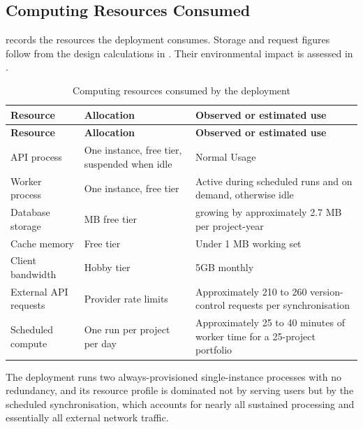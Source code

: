 \subsection{Computing Resources Consumed}
\label{subsec:resources-consumed}

 records the resources the deployment consumes.
Storage and request figures follow from the design calculations in
. Their environmental impact is assessed in
.

\begin{longtable}{
  >{\raggedright\arraybackslash}p{}
  >{\raggedright\arraybackslash}p{}
  >{\raggedright\arraybackslash}p{}
}
\caption{Computing resources consumed by the deployment}
\label{tab:resource-consumption}\\
\toprule
\textbf{Resource} & \textbf{Allocation} & \textbf{Observed or estimated use} \\
\midrule
\endfirsthead
\toprule
\textbf{Resource} & \textbf{Allocation} & \textbf{Observed or estimated use} \\
\midrule
\endhead
\bottomrule
\endlastfoot
API process & One instance, free tier, suspended when idle & Normal Usage \\
Worker process & One instance, free tier & Active during scheduled runs and on
demand, otherwise idle \\
Database storage & 500 MB free tier &  growing by approximately 2.7 MB per project-year \\
Cache memory & Free tier & Under 1 MB working set \\
Client bandwidth & Hobby tier & 5GB monthly \\
External API requests & Provider rate limits & Approximately 210 to 260 version-control requests per synchronisation \\
Scheduled compute & One run per project per day & Approximately 25 to 40 minutes of worker time for a 25-project portfolio \\
\end{longtable}

The deployment runs two always-provisioned single-instance processes with no
redundancy, and its resource profile is dominated not by serving users but by the
scheduled synchronisation, which accounts for nearly all sustained processing and
essentially all external network traffic.
